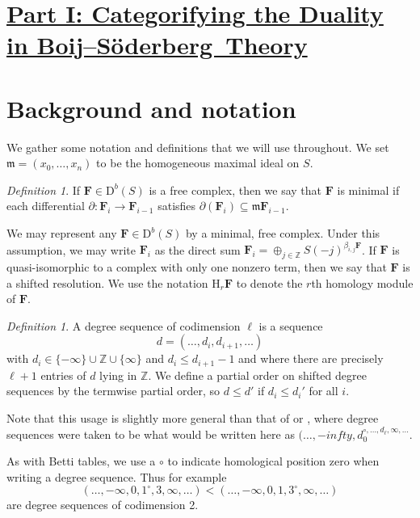 \documentclass[12pt]{amsart}
\theoremstyle{definition}
\theoremstyle{remark}
\newtheorem{defn}[lemma]{Definition}
\newcommand{\HH}{\mathrm{H}}
\newcommand{\ZZ}{\mathbb{Z}}
\newcommand{\dd}{d}
\newcommand{\FF}{\mathbf{F}}
\newcommand{\defi}[1]{\textsf{#1}} %
\newcommand{\zp}{\circ}
\newcommand{\DD}{\mathrm{D}}
\def\BS{Boij--S\"oderberg~}
\begin{document}
\section*{\underline{{Part I: Categorifying the Duality in \BS Theory}}}
\section{Background and notation}\label{sec:notation}
We gather some notation and definitions that we will use throughout.  We set $\mathfrak m=(x_0, \dots, x_n)$ to be the homogeneous maximal ideal on $S$.
\begin{defn}
If $\FF\in \DD^b(S)$ is a free complex, then we say that $\FF$ is \defi{minimal} if each differential $\partial: \FF_i\to \FF_{i-1}$ satisfies $\partial(\FF_i)\subseteq \mathfrak m\FF_{i-1}$.
\end{defn}
We may represent any $\FF\in \DD^b(S)$ by a minimal, free complex.  Under this assumption, we may write $\FF_i$ as the direct sum $\FF_i=\oplus_{j\in \ZZ} S(-j)^{\beta_{i,j}\FF}$.  If $\FF$ is quasi-isomorphic to a complex with only one nonzero term, then we say that $\FF$ is a \defi{shifted resolution}.  We use the notation $\HH_r\FF$ to denote the $r$th homology module of $\FF$.

\begin{defn}\label{def:deg seq}
A \defi{ degree sequence of codimension $\ell$} is a sequence
\[{\dd}=(\dots, d_i, d_{i+1}, \dots)
\]
with  $d_{i} \in \{-\infty\}\cup \ZZ\cup \{\infty\}$ and $d_i \leq d_{i+1}-1$ and 
where there are precisely $\ell+1$ entries of $\dd$ lying in $\ZZ$. 
We define a partial order on shifted degree sequences by the termwise partial order, so $d\leq d'$ if $d_i\leq d_i'$ for all $i$.
\end{defn}
Note that this usage is slightly more general than that of \cite{eis-schrey1} or \cite{boij-sod2}, where degree
sequences were taken to be what would be written here as
$(\dots,-infty,d_{0}^{\zp,\dots,d_{\ell}, \infty,\dots}$.

As with Betti tables, we use a $\zp$ to indicate homological position zero when writing a degree sequence. 
Thus for example
$$
(\dots, -\infty , 0, 1^{\circ}, 3, \infty, \dots) < (\dots, -\infty , 0, 1, 3^{\circ}, \infty, \dots) 
$$
are  degree sequences of codimension 2.
\end{document}
